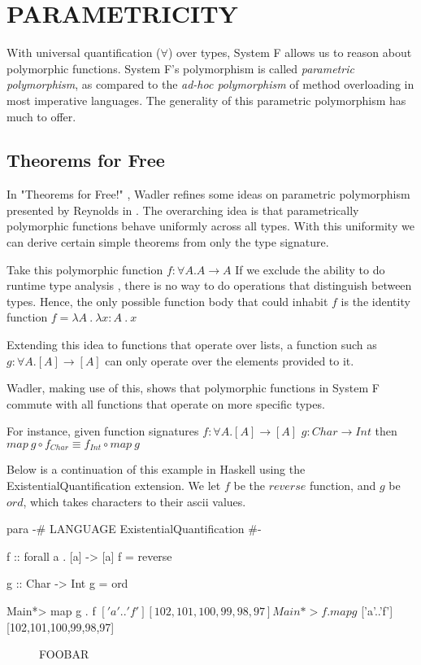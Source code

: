 \chapter{PARAMETRICITY}\label{ch:parametricity}
With universal quantification ($\forall $) over types, System F allows us to reason about polymorphic functions. System F's polymorphism is called \emph{parametric polymorphism}, as compared to the \emph{ad-hoc polymorphism} of method overloading in most imperative languages. The generality of this parametric polymorphism has much to offer.

\section{Theorems for Free}
In "Theorems for Free!" \cite{theoremsForFree}, Wadler refines some ideas on parametric polymorphism presented by Reynolds in \cite{reynolds}. The overarching idea is that parametrically polymorphic functions behave uniformly across all types. With this uniformity we can derive certain simple theorems from only the type signature.

Take this polymorphic function $f : \forall A . A \rightarrow A$
If we exclude the ability to do runtime type analysis \cite{vytinFree}, there is no way to do operations that distinguish between types. Hence, the only possible function body that could inhabit $f$ is the identity function $f = \lambda A\ .\ \lambda x : A\ .\ x $

Extending this idea to functions that operate over lists, a function such as $g : \forall A . [A] \rightarrow [A] $ can only operate over the elements provided to it.

Wadler, making use of this, shows that polymorphic functions in System F commute with all functions that operate on more specific types.

For instance, given function signatures
$f : \forall A . [A] \rightarrow [A] $
$g : Char \rightarrow Int $
then
$map\ g \circ f_{Char} \equiv f_{Int} \circ map\ g$

Below is a continuation of this example in Haskell using the ExistentialQuantification extension. We let $f$ be the $reverse$ function, and $g$ be $ord$, which takes characters to their ascii values.
\begin{SaveVerbatim}{para}
{-# LANGUAGE ExistentialQuantification #-}

f :: forall a . [a] -> [a]
f = reverse

g :: Char -> Int
g = ord

Main*> map g . f $ ['a'..'f']
  [102,101,100,99,98,97]

Main*> f . map g $ ['a'..'f']
  [102,101,100,99,98,97]
\end{SaveVerbatim}
\begin{figure}
  \caption{FOOBAR}
  \label{fig:const}
\end{figure}


